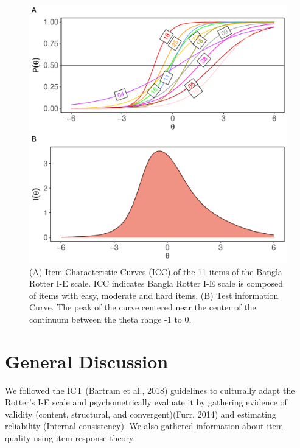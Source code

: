 \documentclass[
  man]{apa6}
\begin{document}
\begin{figure}
\includegraphics[width=7in]{Figures/600/icc_tic} \caption{(A) Item Characteristic Curves (ICC) of the 11 items of the Bangla Rotter I-E scale. ICC indicates Bangla Rotter I-E scale is composed of items with easy, moderate and hard items. (B) Test information Curve. The peak of the curve centered near the center of the continuum between the theta range -1 to 0.}\label{fig:figICC}
\end{figure}

\hypertarget{general-discussion}{%
\section{General Discussion}\label{general-discussion}}

We followed the ICT (Bartram et al., 2018) guidelines to culturally adapt the Rotter's I-E scale and psychometrically evaluate it by gathering evidence of validity (content, structural, and convergent)(Furr, 2014) and estimating reliability (Internal consistency). We also gathered information about item quality using item response theory.
\end{document}
